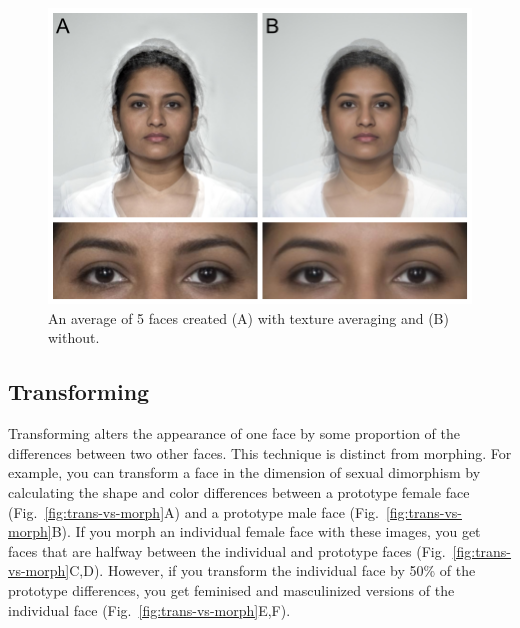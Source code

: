 \documentclass[
  man,floatsintext]{apa6}
\begin{document}
\begin{figure}
\includegraphics[width=1\linewidth]{index_files/figure-latex/avg-texture-1} \caption{An average of 5 faces created (A) with texture averaging and (B) without.}\label{fig:avg-texture}
\end{figure}

\hypertarget{transforming}{%
\subsection{Transforming}\label{transforming}}

Transforming alters the appearance of one face by some proportion of the differences between two other faces. This technique is distinct from morphing. For example, you can transform a face in the dimension of sexual dimorphism by calculating the shape and color differences between a prototype female face (Fig.~\ref{fig:trans-vs-morph}A) and a prototype male face (Fig.~\ref{fig:trans-vs-morph}B). If you morph an individual female face with these images, you get faces that are halfway between the individual and prototype faces (Fig.~\ref{fig:trans-vs-morph}C,D). However, if you transform the individual face by 50\% of the prototype differences, you get feminised and masculinized versions of the individual face (Fig.~\ref{fig:trans-vs-morph}E,F).
\end{document}
